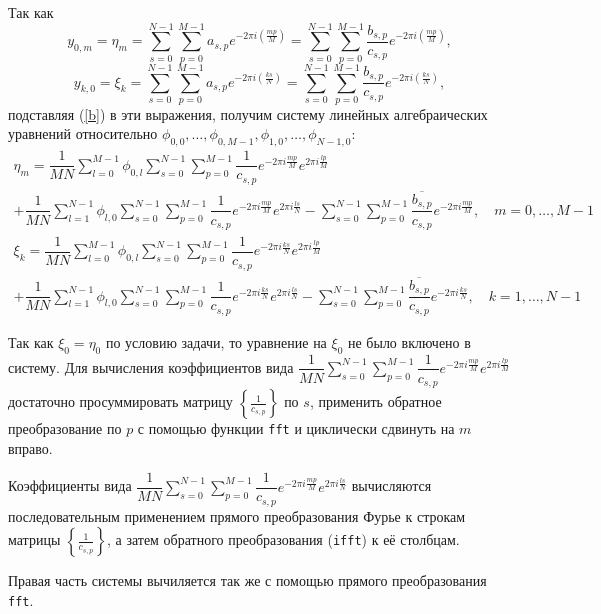 \documentclass[12pt, a4paper]{article} %
\begin{document}
Так как
$$ y_{0,m} = \eta_m =  \sum_{s=0}^{N-1}\sum_{p=0}^{M-1}a_{s,p}e^{-2\pi i \left(\frac{mp}{M}\right)} = 
\sum_{s=0}^{N-1}\sum_{p=0}^{M-1}\dfrac{b_{s,p}}{c_{s,p}}e^{-2\pi i \left(\frac{mp}{M}\right)},$$
$$  y_{k,0} = \xi_k = \sum_{s=0}^{N-1}\sum_{p=0}^{M-1}a_{s,p}e^{-2\pi i \left(\frac{ks}{N}\right)} = 
\sum_{s=0}^{N-1}\sum_{p=0}^{M-1}\dfrac{b_{s,p}}{c_{s,p}}e^{-2\pi i \left(\frac{ks}{N}\right)},$$
подставляя (\ref{b}) в эти выражения, получим систему линейных алгебраических уравнений относительно
$\phi_{0,0}, \ldots, \phi_{0,M-1}, \phi_{1,0}, \ldots, \phi_{N-1,0}$:
\begin{multline}
\eta_m = \dfrac{1}{MN}\sum_{l=0}^{M-1}\phi_{0,l}\sum_{s=0}^{N-1}\sum_{p=0}^{M-1}\dfrac{1}{c_{s,p}}e^{-2\pi i\frac{mp}{M}}e^{2\pi i\frac{lp}{M}} \\
+ \dfrac{1}{MN}\sum_{l=1}^{N-1}\phi_{l,0}\sum_{s=0}^{N-1}\sum_{p=0}^{M-1}\dfrac{1}{c_{s,p}}e^{-2\pi i\frac{mp}{M}}e^{2\pi i\frac{ls}{N}}
- \sum_{s=0}^{N-1}\sum_{p=0}^{M-1}\dfrac{\overline{b_{s,p}}}{c_{s,p}}e^{-2\pi i\frac{mp}{M}}, \quad m = 0,\ldots,M-1
\end{multline}
\begin{multline}
\xi_k = \dfrac{1}{MN}\sum_{l=0}^{M-1}\phi_{0,l}\sum_{s=0}^{N-1}\sum_{p=0}^{M-1}\dfrac{1}{c_{s,p}}e^{-2\pi i\frac{ks}{N}}e^{2\pi i\frac{lp}{M}} \\
+ \dfrac{1}{MN}\sum_{l=1}^{N-1}\phi_{l,0}\sum_{s=0}^{N-1}\sum_{p=0}^{M-1}\dfrac{1}{c_{s,p}}e^{-2\pi i\frac{ks}{N}}e^{2\pi i\frac{ls}{N}}
- \sum_{s=0}^{N-1}\sum_{p=0}^{M-1}\dfrac{\overline{b_{s,p}}}{c_{s,p}}e^{-2\pi i\frac{ks}{N}}, \quad k = 1,\ldots,N-1
\end{multline}

Так как $\xi_0 = \eta_0$ по условию задачи, то уравнение на $\xi_0$ не было включено в систему.
Для вычисления коэффициентов вида 
$\dfrac{1}{MN}\sum\limits_{s=0}^{N-1}\sum\limits_{p=0}^{M-1}\dfrac{1}{c_{s,p}}e^{-2\pi i\frac{mp}{M}}e^{2\pi i\frac{lp}{M}}$ достаточно
просуммировать матрицу $\left\{\frac{1}{c_{s,p}}\right\}$ по $s$, применить обратное преобразование по $p$ с помощью функции \texttt{fft} и циклически сдвинуть на $m$ вправо.

Коэффициенты вида 
$\dfrac{1}{MN}\sum\limits_{s=0}^{N-1}\sum\limits_{p=0}^{M-1}\dfrac{1}{c_{s,p}}e^{-2\pi i\frac{mp}{M}}e^{2\pi i\frac{ls}{N}}$ 
вычисляются последовательным применением прямого преобразования Фурье к строкам матрицы  $\left\{\frac{1}{c_{s,p}}\right\}$, а затем
обратного преобразования (\texttt{ifft}) к её столбцам.

Правая часть системы вычиляется так же с помощью прямого преобразования \texttt{fft}.
\end{document}
